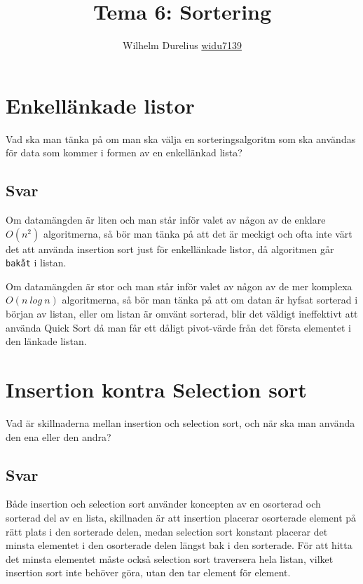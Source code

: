 \documentclass[a5paper,10pt,oneside]{article}
\title{Tema 6: Sortering}
\author{Wilhelm Durelius \url{widu7139}}
\begin{document}
\maketitle


\section{Enkellänkade listor}

Vad ska man tänka på om man ska välja en sorteringsalgoritm som ska användas för data som kommer i formen av en enkellänkad lista?

\subsection{Svar}
Om datamängden är liten och man står inför valet av någon av de enklare $O(n^2)$ algoritmerna,
så bör man tänka på att det är meckigt och ofta inte värt det att använda insertion sort just för enkellänkade listor, då algoritmen går \texttt{bakåt} i listan.

Om datamängden är stor och man står inför valet av någon av de mer komplexa $O(n\ log\ n)$ algoritmerna,
så bör man tänka på att om datan är hyfsat sorterad i början av listan, eller om listan är omvänt sorterad,
blir det väldigt ineffektivt att använda Quick Sort då man får ett dåligt pivot-värde från det första elementet 
i den länkade listan.

\section{Insertion kontra Selection sort}
Vad är skillnaderna mellan insertion och selection sort, och när ska man använda den ena eller den andra?
\subsection{Svar}
Både insertion och selection sort använder koncepten av en osorterad och sorterad del av en lista, skillnaden är
att insertion placerar osorterade element på rätt plats i den sorterade delen, medan selection sort konstant
placerar det minsta elementet i den osorterade delen längst bak i den sorterade. 
För att hitta det minsta elementet måste också selection sort traversera hela listan, vilket 
insertion sort inte behöver göra, utan den tar element för element.
\end{document}
